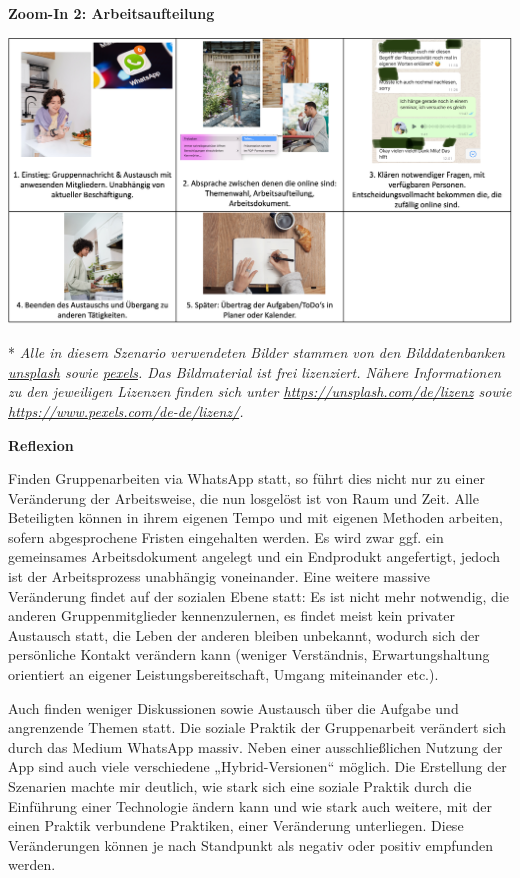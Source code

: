 \documentclass[
  a4paper,
]{book}
\begin{document}
{\textbf{Zoom-In 2: Arbeitsaufteilung}}

\begin{center}\includegraphics{Figures/Zoom-in2} \end{center}

* \emph{Alle in diesem Szenario verwendeten Bilder stammen von den Bilddatenbanken \href{https://unsplash.com}{unsplash} sowie \href{https://www.pexels.com}{pexels}. Das Bildmaterial ist frei lizenziert. Nähere Informationen zu den jeweiligen Lizenzen finden sich unter \url{https://unsplash.com/de/lizenz} sowie \href{\%5Bhttps://www.pexels.com/de-de/lizenz/}{https://www.pexels.com/de-de/lizenz/}.}

\textbf{Reflexion}

Finden Gruppenarbeiten via WhatsApp statt, so führt dies nicht nur zu einer Veränderung der Arbeitsweise, die nun losgelöst ist von Raum und Zeit. Alle Beteiligten können in ihrem eigenen Tempo und mit eigenen Methoden arbeiten, sofern abgesprochene Fristen eingehalten werden. Es wird zwar ggf. ein gemeinsames Arbeitsdokument angelegt und ein Endprodukt angefertigt, jedoch ist der Arbeitsprozess unabhängig voneinander. Eine weitere massive Veränderung findet auf der sozialen Ebene statt: Es ist nicht mehr notwendig, die anderen Gruppenmitglieder kennenzulernen, es findet meist kein privater Austausch statt, die Leben der anderen bleiben unbekannt, wodurch sich der persönliche Kontakt verändern kann (weniger Verständnis, Erwartungshaltung orientiert an eigener Leistungsbereitschaft, Umgang miteinander etc.).

Auch finden weniger Diskussionen sowie Austausch über die Aufgabe und angrenzende Themen statt. Die soziale Praktik der Gruppenarbeit verändert sich durch das Medium WhatsApp massiv. Neben einer ausschließlichen Nutzung der App sind auch viele verschiedene „Hybrid-Versionen`` möglich.
Die Erstellung der Szenarien machte mir deutlich, wie stark sich eine soziale Praktik durch die Einführung einer Technologie ändern kann und wie stark auch weitere, mit der einen Praktik verbundene Praktiken, einer Veränderung unterliegen. Diese Veränderungen können je nach Standpunkt als negativ oder positiv empfunden werden.
\end{document}
